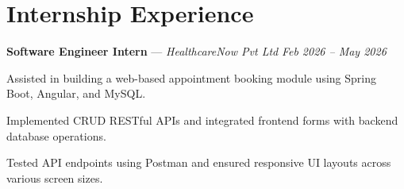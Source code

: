 \documentclass[letterpaper,10pt]{article}
\begin{document}
\section{Internship Experience}
\begin{resumelist}
  \item \textbf{Software Engineer Intern} --- \textit{HealthcareNow Pvt Ltd} \hfill \textit{Feb 2026 -- May 2026}
  \begin{resumelist}
    \item Assisted in building a web-based appointment booking module using Spring Boot, Angular, and MySQL.
    \item Implemented CRUD RESTful APIs and integrated frontend forms with backend database operations.
    \item Tested API endpoints using Postman and ensured responsive UI layouts across various screen sizes.
  \end{resumelist}
\end{resumelist}

\end{document}
